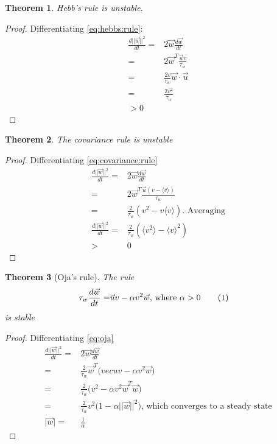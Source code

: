 \documentclass[]{article}
\newcommand\numberthis{\addtocounter{equation}{1}\tag{\theequation}}
\newtheorem{thm}{Theorem}
\begin{document}
\begin{thm}
	Hebb's rule is unstable.
\end{thm}

\begin{proof}
	Differentiating \eqref{eq:hebbs:rule}:
	\begin{align*}
		\frac{d\lvert\lvert\vec{w}\rvert\rvert^2}{dt} =& 2 \vec{w} \frac{d\vec{w}}{dt}\\
		=& 2\vec{w}^T\frac{\vec{u} v}{\tau_w}\\
		=& \frac{2v}{\tau_w} \vec{w} \cdot \vec{u}\\
		=& \frac{2v^2}{\tau_w}\\
		>0
	\end{align*}
\end{proof}

\begin{thm}
	The covariance rule is unstable
\end{thm}

\begin{proof}
	Differentiating \eqref{eq:covariance:rule}
	\begin{align*}
		\frac{d\lvert\lvert\vec{w}\rvert\rvert^2}{dt} =& 2 \vec{w} \frac{d\vec{w}}{dt}\\
		=& 2 \vec{w}^T \frac{\vec{u}(v-\langle v \rangle)}{\tau_w}\\
		=& \frac{2}{\tau_w} (v^2-v\langle v \rangle)\text{. Averaging}\\
		\frac{d\lvert\lvert\vec{w}\rvert\rvert^2}{dt} =& \frac{2}{\tau_w}(\langle v^2 \rangle - \langle v \rangle^2)\\
		>& 0
	\end{align*}
\end{proof}

\begin{thm}[Oja's rule]
	The rule
	\begin{align*}
		\tau_w \frac{d\vec{w}}{dt} =& \vec{u} v - \alpha v^2 \vec{w} \text{, where $\alpha>0$} \numberthis \label{eq:oja}
	\end{align*}
is stable
\end{thm}

\begin{proof}
	Differentiating \eqref{eq:oja}
	\begin{align*}
		\frac{d\lvert\lvert\vec{w}\rvert\rvert^2}{dt} =& 2 \vec{w} \frac{d\vec{w}}{dt}\\
		=& \frac{2}{\tau_w} \vec{w}^T\big(vec{u}v - \alpha v^2 \vec{w}\big)\\
		=& \frac{2}{\tau_w} \big( v^2 - \alpha v^2 \vec{w}^T\vec{w}\big)\\
		=& \frac{2}{\tau_w} v^2 \big(1 - \alpha\lvert\lvert\vec{w}\rvert\rvert^2\big)\text{, which converges to a steady state}\\
		\lvert\vec{w}\rvert =& \frac{1}{\alpha}
	\end{align*}
\end{proof}
\end{document}
